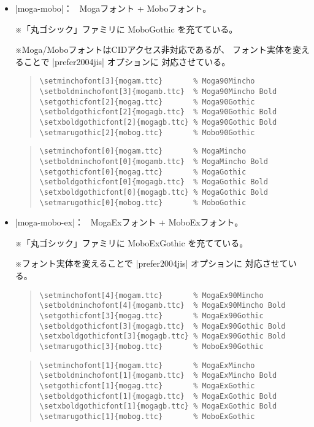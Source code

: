 \documentclass[uplatex,dvipdfmx,a4paper]{jsarticle}
\newcommand{\Note}{\par\noindent ※}
\newcommand{\Means}{：\ }
\begin{document}
\begin{itemize}
\item |moga-mobo|\Means
   Mogaフォント + Moboフォント。
   \Note 「丸ゴシック」ファミリに MoboGothic を充てている。
   \Note Moga/MoboフォントはCIDアクセス非対応であるが、
   フォント実体を変えることで |prefer2004jis| オプションに
   対応させている。
   \par\medskip
\begin{quote}\small\begin{verbatim}
\setminchofont[3]{mogam.ttc}       % Moga90Mincho
\setboldminchofont[3]{mogamb.ttc}  % Moga90Mincho Bold
\setgothicfont[2]{mogag.ttc}       % Moga90Gothic
\setboldgothicfont[2]{mogagb.ttc}  % Moga90Gothic Bold
\setxboldgothicfont[2]{mogagb.ttc} % Moga90Gothic Bold
\setmarugothic[2]{mobog.ttc}       % Mobo90Gothic
\end{verbatim}\end{quote}
   \par\medskip
\begin{quote}\small\begin{verbatim}
\setminchofont[0]{mogam.ttc}       % MogaMincho
\setboldminchofont[0]{mogamb.ttc}  % MogaMincho Bold
\setgothicfont[0]{mogag.ttc}       % MogaGothic
\setboldgothicfont[0]{mogagb.ttc}  % MogaGothic Bold
\setxboldgothicfont[0]{mogagb.ttc} % MogaGothic Bold
\setmarugothic[0]{mobog.ttc}       % MoboGothic
\end{verbatim}\end{quote}

\item |moga-mobo-ex|\Means
   MogaExフォント + MoboExフォント。
   \Note 「丸ゴシック」ファミリに MoboExGothic を充てている。
   \Note フォント実体を変えることで |prefer2004jis| オプションに
   対応させている。
   \par\medskip
\begin{quote}\small\begin{verbatim}
\setminchofont[4]{mogam.ttc}       % MogaEx90Mincho
\setboldminchofont[4]{mogamb.ttc}  % MogaEx90Mincho Bold
\setgothicfont[3]{mogag.ttc}       % MogaEx90Gothic
\setboldgothicfont[3]{mogagb.ttc}  % MogaEx90Gothic Bold
\setxboldgothicfont[3]{mogagb.ttc} % MogaEx90Gothic Bold
\setmarugothic[3]{mobog.ttc}       % MoboEx90Gothic
\end{verbatim}\end{quote}
   \par\medskip
\begin{quote}\small\begin{verbatim}
\setminchofont[1]{mogam.ttc}       % MogaExMincho
\setboldminchofont[1]{mogamb.ttc}  % MogaExMincho Bold
\setgothicfont[1]{mogag.ttc}       % MogaExGothic
\setboldgothicfont[1]{mogagb.ttc}  % MogaExGothic Bold
\setxboldgothicfont[1]{mogagb.ttc} % MogaExGothic Bold
\setmarugothic[1]{mobog.ttc}       % MoboExGothic
\end{verbatim}\end{quote}


\end{itemize}
\end{document}
